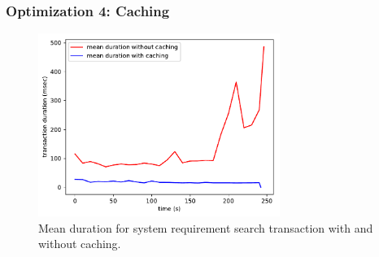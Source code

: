 \begin{frame}
\frametitle{Optimization 4: Caching}
\begin{figure}
	\centering
	\includegraphics[width=0.70\textwidth]{images/caching}
	\caption{Mean duration for system requirement search transaction with and without caching.}\label{fig:caching}
\end{figure}
\end{frame}
